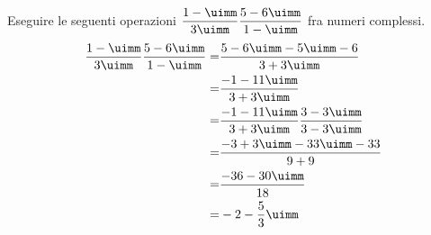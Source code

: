 	Eseguire le seguenti operazioni  $\dfrac{1-\uimm}{3\uimm}\dfrac{5-6\uimm}{1-\uimm}$ fra numeri complessi.
	\begin{align*}
	\dfrac{1-\uimm}{3\uimm}\dfrac{5-6\uimm}{1-\uimm}=&\dfrac{5-6\uimm-5\uimm-6}{3+3\uimm}\\
	=&\dfrac{-1-11\uimm}{3+3\uimm}\\
	=&\dfrac{-1-11\uimm}{3+3\uimm}\dfrac{3-3\uimm}{3-3\uimm}\\
	=&\dfrac{-3+3\uimm-33\uimm-33}{9+9}\\
	=&\dfrac{-36-30\uimm}{18}\\
	=&-2-\dfrac{5}{3}\uimm
	\end{align*}
